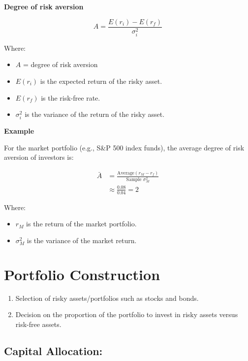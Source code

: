 \documentclass[
]{book}
\providecommand{\tightlist}{%
  \setlength{\itemsep}{0pt}\setlength{\parskip}{0pt}}
\begin{document}
\textbf{Degree of risk aversion}

\[
A = \frac{E(r_i) - E(r_f)}{\sigma_i^2}
\]

Where:

\begin{itemize}
\tightlist
\item
  \(A\) = degree of risk aversion
\item
  \(E(r_i)\) is the expected return of the risky asset.
\item
  \(E(r_f)\) is the risk-free rate.
\item
  \(\sigma_i^2\) is the variance of the return of the risky asset.
\end{itemize}

\textbf{Example}

For the market portfolio (e.g., S\&P 500 index funds), the average degree of risk aversion of investors is:

\[
\begin{aligned}
\bar{A} &= \frac{\text{Average}(r_M - r_f)}{\text{Sample } \sigma_M^2}\\
 &\approx \frac{0.08}{0.04} = 2
\end{aligned}
\]

Where:

\begin{itemize}
\tightlist
\item
  \(r_M\) is the return of the market portfolio.
\item
  \(\sigma_M^2\) is the variance of the market return.
\end{itemize}

\hypertarget{portfolio-construction}{%
\section{Portfolio Construction}\label{portfolio-construction}}

\begin{enumerate}
\def\labelenumi{\arabic{enumi}.}
\item
  Selection of risky assets/portfolios such as stocks and bonds.
\item
  Decision on the proportion of the portfolio to invest in risky assets versus risk-free assets.
\end{enumerate}

\hypertarget{capital-allocation}{%
\subsection{Capital Allocation:}\label{capital-allocation}}
\end{document}
